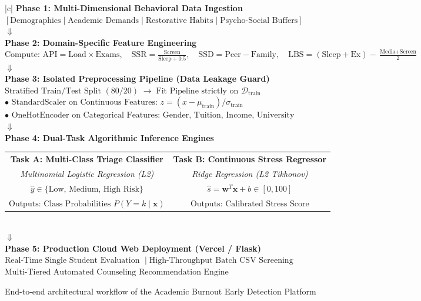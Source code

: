 \documentclass[12pt,a4paper,oneside]{report}
\begin{document}
\begin{figure}[H]
\centering
\begin{tabular}{|c|}
\hline
\textbf{\large Phase 1: Multi-Dimensional Behavioral Data Ingestion} \\
$\left[ \text{Demographics} \;\vert\; \text{Academic Demands} \;\vert\; \text{Restorative Habits} \;\vert\; \text{Psycho-Social Buffers} \right]$ \\
\hline
$\Downarrow$ \\
\hline
\textbf{\large Phase 2: Domain-Specific Feature Engineering} \\
$\text{Compute: } \text{API} = \text{Load} \times \text{Exams}, \quad \text{SSR} = \frac{\text{Screen}}{\text{Sleep}+0.5}, \quad \text{SSD} = \text{Peer} - \text{Family}, \quad \text{LBS} = (\text{Sleep}+\text{Ex}) - \frac{\text{Media}+\text{Screen}}{2}$ \\
\hline
$\Downarrow$ \\
\hline
\textbf{\large Phase 3: Isolated Preprocessing Pipeline (Data Leakage Guard)} \\
$\text{Stratified Train/Test Split } (80/20) \;\longrightarrow\; \text{Fit Pipeline strictly on } \mathcal{D}_{\text{train}}$ \\
$\bullet \text{ StandardScaler on Continuous Features: } z = (x - \mu_{\text{train}}) / \sigma_{\text{train}}$ \\
$\bullet \text{ OneHotEncoder on Categorical Features: Gender, Tuition, Income, University}$ \\
\hline
$\Downarrow$ \\
\hline
\textbf{\large Phase 4: Dual-Task Algorithmic Inference Engines} \\
\begin{tabular}{cc}
\textbf{Task A: Multi-Class Triage Classifier} & \textbf{Task B: Continuous Stress Regressor} \\
\textit{Multinomial Logistic Regression (L2)} & \textit{Ridge Regression (L2 Tikhonov)} \\
$\hat{y} \in \{ \text{Low, Medium, High Risk} \}$ & $\hat{s} = \mathbf{w}^T \mathbf{x} + b \in [0, 100]$ \\
$\text{Outputs: Class Probabilities } P(Y=k \mid \mathbf{x})$ & $\text{Outputs: Calibrated Stress Score}$ \\
\end{tabular} \\
\hline
$\Downarrow$ \\
\hline
\textbf{\large Phase 5: Production Cloud Web Deployment (Vercel / Flask)} \\
$\text{Real-Time Single Student Evaluation } \;\vert\; \text{High-Throughput Batch CSV Screening}$ \\
$\text{Multi-Tiered Automated Counseling Recommendation Engine}$ \\
\hline
\end{tabular}
\caption{End-to-end architectural workflow of the Academic Burnout Early Detection Platform}
\label{fig:methodology_flow}
\end{figure}
\end{document}
